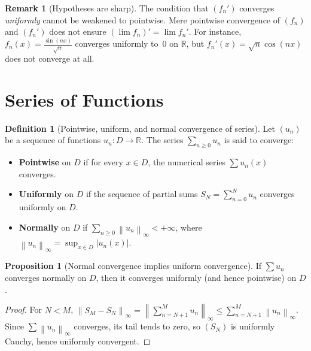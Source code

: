\documentclass[12pt,a4paper]{book}
\theoremstyle{definition}
\newtheorem{definition}{Definition}[chapter]
\newtheorem{proposition}{Proposition}[chapter]
\newtheorem{remark}{Remark}[chapter]
\newcommand{\R}{\mathbb{R}}
\newcommand{\abs}[1]{\left\lvert #1 \right\rvert}
\newcommand{\norm}[1]{\left\lVert #1 \right\rVert}
\begin{document}
\begin{remark}[Hypotheses are sharp]\label{rem:deriv-interchange-sharp}
  The condition that $(f_n')$ converges \emph{uniformly} cannot be
  weakened to pointwise.  Mere pointwise convergence of $(f_n)$ and
  $(f_n')$ does not ensure $(\lim f_n)'=\lim f_n'$.  For instance,
  $f_n(x)=\frac{\sin(nx)}{\sqrt{n}}$ converges uniformly to~$0$ on
  $\R$, but $f_n'(x)=\sqrt{n}\cos(nx)$ does not converge at all.
\end{remark}


\section{Series of Functions}\label{sec:series-fn}

\begin{definition}[Pointwise, uniform, and normal convergence of series]\label{def:series-modes}
  Let $(u_n)$ be a sequence of functions $u_n\colon D\to\R$.  The series
  $\sum_{n\ge0}u_n$ is said to converge:
  \begin{itemize}
    \item \textbf{Pointwise} on $D$ if for every $x\in D$, the numerical
      series $\sum u_n(x)$ converges.
    \item \textbf{Uniformly} on $D$ if the sequence of partial sums
      $S_N=\sum_{n=0}^N u_n$ converges uniformly on $D$.
    \item \textbf{Normally} on $D$ if
      $\sum_{n\ge0}\norm{u_n}_\infty<+\infty$,
      where $\norm{u_n}_\infty=\sup_{x\in D}\abs{u_n(x)}$.
  \end{itemize}
\end{definition}

\begin{proposition}[Normal convergence implies uniform convergence]\label{prop:normal-implies-unif}
  If $\sum u_n$ converges normally on $D$, then it converges uniformly
  (and hence pointwise) on $D$.
\end{proposition}

\begin{proof}
  For $N<M$,
  $\norm{S_M-S_N}_\infty = \norm{\sum_{n=N+1}^M u_n}_\infty
  \le \sum_{n=N+1}^M \norm{u_n}_\infty$.  Since $\sum\norm{u_n}_\infty$
  converges, its tail tends to zero, so $(S_N)$ is uniformly Cauchy,
  hence uniformly convergent.
\end{proof}
\end{document}
